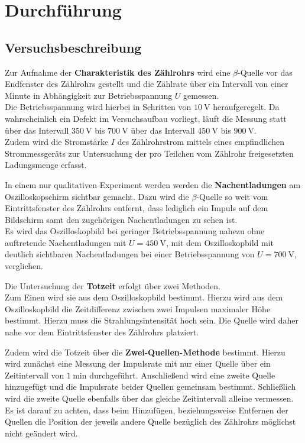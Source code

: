 \section{Durchführung}
\label{sec:Durchführung}



\subsection{Versuchsbeschreibung}
\label{sec:Versuchsbeschreibung}
Zur Aufnahme der \textbf{Charakteristik des Zählrohrs} wird eine $\beta$-Quelle vor das Endfenster des Zählrohrs gestellt und die Zählrate über ein Intervall von einer Minute in Abhängigkeit zur Betriebsspannung $U$ gemessen.\\
Die Betriebsspannung wird hierbei in Schritten von $\SI{10}{\volt}$ heraufgeregelt.
Da wahrscheinlich ein Defekt im Versuchsaufbau vorliegt, läuft die Messung statt über das Intervall $\SI{350}{\volt}$ bis $\SI{700}{\volt}$ über das Intervall $\SI{450}{\volt}$ bis $\SI{900}{\volt}$.\\
Zudem wird die Stromstärke $I$ des Zählrohrstrom mittels eines empfindlichen Strommessgeräts zur Untersuchung der pro Teilchen vom Zählrohr freigesetzten Ladungsmenge erfasst.

In einem nur qualitativen Experiment werden werden die \textbf{Nachentladungen} am Oszilloskopschirm sichtbar gemacht.
Dazu wird die $\beta$-Quelle so weit vom Eintrittsfenster des Zählrohrs entfernt, dass lediglich ein Impuls auf dem Bildschirm samt den zugehörigen Nachentladungen zu sehen ist.\\
Es wird das Oszilloskopbild bei geringer Betriebsspannung nahezu ohne auftretende Nachentladungen mit $U=\SI{450}{\volt}$, mit dem Oszilloskopbild mit deutlich sichtbaren Nachentladungen bei einer Betriebsspannung von $U=\SI{700}{\volt}$, verglichen.

Die Untersuchung der \textbf{Totzeit} erfolgt über zwei Methoden.\\
Zum Einen wird sie aus dem Oszilloskopbild bestimmt.
Hierzu wird aus dem Oszilloskopbild die Zeitdifferenz zwischen zwei Impulsen maximaler Höhe bestimmt. Hierzu muss die Strahlungsintensität hoch sein. Die Quelle wird daher nahe vor dem Eintrittsfenster des Zählrohrs platziert.

Zudem wird die Totzeit über die \textbf{Zwei-Quellen-Methode} bestimmt.
Hierzu wird zunächst eine Messung der Impulsrate mit nur einer Quelle über ein Zeitintervall von $\SI{1}{\minute}$ durchgeführt.
Anschließend wird eine zweite Quelle hinzugefügt und die Impulsrate beider Quellen gemeinsam bestimmt. Schließlich wird die zweite Quelle ebenfalls über das gleiche Zeitintervall alleine vermessen.
Es ist darauf zu achten, dass beim Hinzufügen, beziehungsweise Entfernen der Quellen die Position der jeweils andere Quelle bezüglich des Zählrohrs möglichst nicht geändert wird.
